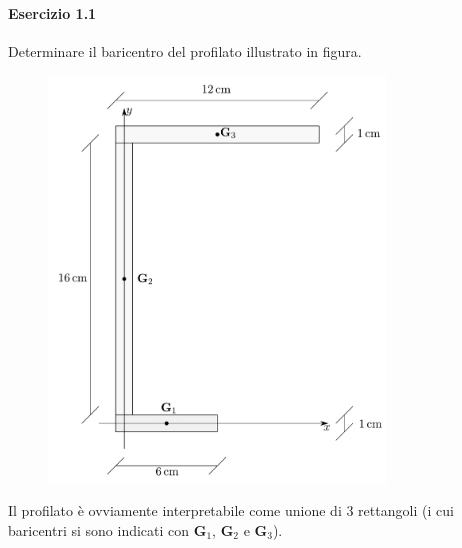 \paragraph{Esercizio 1.1}
Determinare il baricentro del profilato illustrato in figura.
\renewcommand{\thefigure}{1.1~-~1}
\begin{figure}[h]
\centering
\includegraphics[width=0.80\textwidth]{Immagini/Parte_1/Esercizio1_1/Esercizio1_1.pdf}
\caption{}
\label{Esercizio1_1_1}
\end{figure}

\noindent Il profilato è ovviamente interpretabile come unione di $3$ rettangoli (i cui baricentri si sono indicati con $\mathbf{G}_1$, $\mathbf{G}_2$ e $\mathbf{G}_3$). 

